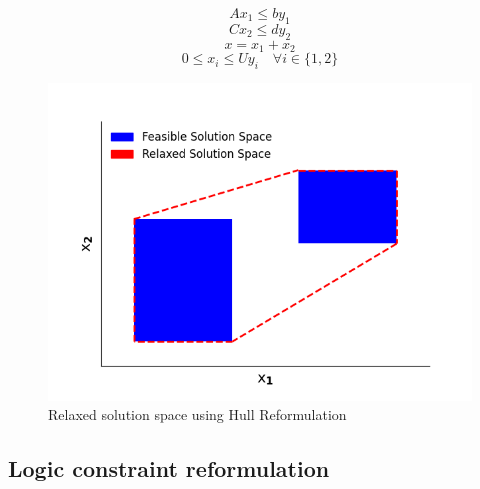 \documentclass{juliacon}
\begin{document}
\begin{equation}
    \label{eq:ex_hull1}
    Ax_1 \leq by_1
\end{equation}
\begin{equation}
    \label{eq:ex_hull0}
    Cx_2 \leq dy_2
\end{equation}
\begin{equation}
    \label{eq:ex_hull2}
    x = x_1 + x_2
\end{equation}
\begin{equation}
    \label{eq:ex_hull3}
    0 \leq x_i \leq U y_i \quad \forall i \in \{1,2\}
\end{equation}

\begin{figure}%
    \centering
    \includegraphics[scale=0.5]{chr.png}
    \caption{Relaxed solution space using Hull Reformulation}
    \label{fig:chr}
\end{figure}
\vskip 6pt

\subsection{Logic constraint reformulation}
\end{document}
